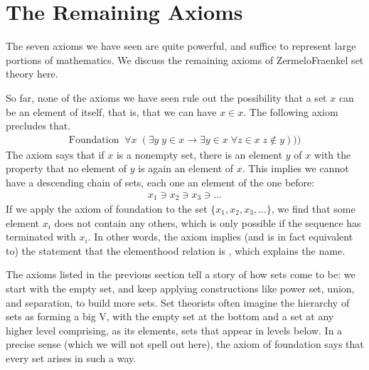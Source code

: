\documentclass[letterpaper,10pt,english]{sphinxmanual}
\begin{document}
\section{The Remaining Axioms}
\label{\detokenize{axiomatic_foundations:the-remaining-axioms}}\label{\detokenize{axiomatic_foundations:id3}}
\sphinxAtStartPar
The seven axioms we have seen are quite powerful, and suffice to represent large portions of mathematics. We discuss the remaining axioms of Zermelo\sphinxhyphen{}Fraenkel set theory here.

\sphinxAtStartPar
So far, none of the axioms we have seen rule out the possibility that a set \(x\) can be an element of itself, that is, that we can have \(x \in x\). The following axiom precludes that.
\begin{equation*}
\begin{split}\text{Foundation} \;\; \forall x \; (\exists y \; y \in x \to \exists y \in x \; \forall z \in x \; z \notin y)))\end{split}
\end{equation*}
\sphinxAtStartPar
The axiom says that if \(x\) is a nonempty set, there is an element \(y\) of \(x\) with the property that no element of \(y\) is again an element of \(x\). This implies we cannot have a descending chain of sets, each one an element of the one before:
\begin{equation*}
\begin{split}x_1 \ni x_2 \ni x_3 \ni \ldots\end{split}
\end{equation*}
\sphinxAtStartPar
If we apply the axiom of foundation to the set \(\{x_1, x_2, x_3, \ldots\}\), we find that some element \(x_i\) does not contain any others, which is only possible if the sequence has terminated with \(x_i\). In other words, the axiom implies (and is in fact equivalent to) the statement that the elementhood relation is , which explains the name.

\sphinxAtStartPar
The axioms listed in the previous section tell a story of how sets come to be: we start with the empty set, and keep applying constructions like power set, union, and separation, to build more sets. Set theorists often imagine the hierarchy of sets as forming a big V, with the empty set at the bottom and a set at any higher level comprising, as its elements, sets that appear in levels below. In a precise sense (which we will not spell out here), the axiom of foundation says that every set arises in such a way.
\end{document}
